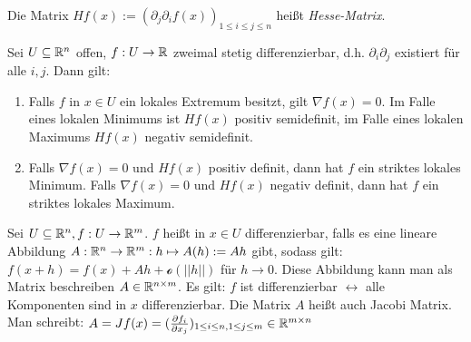 \begin{definition}
	Die Matrix $Hf(x) := (\partial_j \partial_i f(x))_{1 \leq i \leq j \leq n}$ heißt \emph{Hesse-Matrix}.
\end{definition}

\begin{satz}
	Sei $U \subseteq \mathbb{R}^n$ offen, $f : U \rightarrow \mathbb{R}$ zweimal stetig differenzierbar, d.h. $\partial_i \partial_j$ existiert für alle $i, j$. Dann gilt:
	\begin{enumerate}[noitemsep]
		\item Falls $f$ in $x \in U$ ein lokales Extremum besitzt, gilt $\nabla f(x) = 0$. Im Falle eines lokalen Minimums ist $Hf(x)$ positiv semidefinit, im Falle eines lokalen Maximums $Hf(x)$ negativ semidefinit.
		\item Falls $\nabla f(x) = 0$ und $Hf(x)$ positiv definit, dann hat $f$ ein striktes lokales Minimum. Falls $\nabla f(x) = 0$ und $Hf(x)$ negativ definit, dann hat $f$ ein striktes lokales Maximum. 
	\end{enumerate}
\end{satz}

\begin{definition}
	Sei $U \subseteq \mathbb{R}^n, f : U \rightarrow \mathbb{R}^m$. $f$ heißt in $x \in U $ differenzierbar, falls es eine lineare Abbildung $A : \mathbb{R}^n \rightarrow \mathbb{R}^m : h \mapsto A(h) := Ah$ gibt, sodass gilt: $f(x+h) = f(x) + Ah + \mathcal{o}(||h||)$ für $h \rightarrow 0$. Diese Abbildung kann man als Matrix beschreiben $A \in \mathbb{R}^{n \times m}$. Es gilt: $f$ ist differenzierbar $\leftrightarrow$ alle Komponenten sind in $x$ differenzierbar.
	Die Matrix $A$ heißt auch Jacobi Matrix. Man schreibt:
	$A = Jf(x) = (\frac{\partial f_i}{\partial x_j})_{1 \leq i \leq n, 1 \leq j \leq m} \in \mathbb{R}^{m \times n }$
\end{definition}

